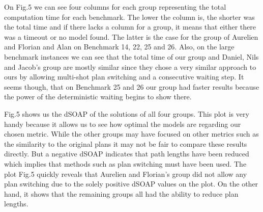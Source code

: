 \documentclass{llncs}
\begin{document}
On Fig.5 we can see four columns for each group representing the total computation time for each benchmark. The lower the column is, the shorter was the total time and if there lacks a column for a group, it means that either there was a timeout or no model found. The latter is the case for the group of Aurelien and Florian \cite{project2} and Alan \cite{project3} on Benchmark 14, 22, 25 and 26.
Also, on the large benchmark instances we can see that the total time of our group \cite{project1} and Daniel, Nils and Jacob's group \cite{project4} are mostly similar since they chose a very similar approach to ours by allowing multi-shot plan switching and a consecutive waiting step. It seems though, that on Benchmark 25 and 26 our group had faster results because the power of the deterministic waiting begins to show there.

Fig.5 shows us the dSOAP of the solutions of all four groups. This plot is very handy because it allows us to see how optimal the models are regarding our chosen metric. While the other groups may have focused on other metrics such as the similarity to the original plans it may not be fair to compare these results directly. But a negative dSOAP indicates that path lengths have been reduced which implies that methods such as plan switching must have been used.
The plot Fig.5 quickly reveals that Aurelien and Florian's group \cite{project2} did not allow any plan switching due to the solely positive dSOAP values on the plot. On the other hand, it shows that the remaining groups all had the ability to reduce plan lengths.
\end{document}
